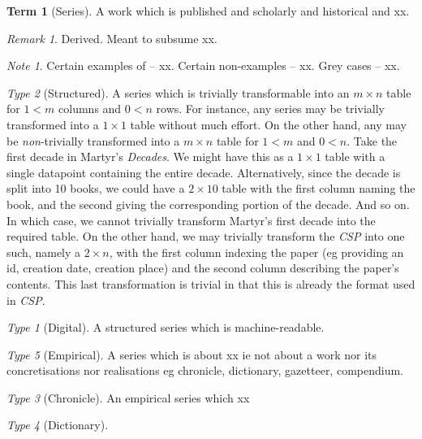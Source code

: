 \documentclass{amsart}%
\newcommand{\titleit}[1]{\textit{#1}}%
\theoremstyle{plain}
\theoremstyle{definition}
\theoremstyle{remark}
\newtheorem*{note}{Note}
\theoremstyle{definition}
\newtheorem{term}{Term}[subsection]%
\theoremstyle{remark}
\newtheorem*{term-type}{Type}
\newtheorem*{term-note}{Remark}
\begin{document}
\begin{term}[Series]
\label{term:series}
A work which is published and scholarly and historical and xx.%
\begin{term-note}
Derived. Meant to subsume xx.
\end{term-note}
\begin{note}
Certain examples of -- xx. Certain non-examples -- xx. Grey cases -- xx.
\end{note}
\begin{term-type}[Structured]
A series which is trivially transformable into an \(m\times n\) table for \(1<m\) columns and \(0<n\) rows. For instance, any series may be trivially transformed into a \(1\times 1\) table without much effort. On the other hand, any may be \emph{non}-trivially transformed into a \(m\times n\) table for \(1<m\) and \(0<n\). Take the first decade in Martyr's \titleit{Decades}. We might have this as a \(1\times 1\) table with a single datapoint containing the entire decade. Alternatively, since the decade is split into 10 books, we could have a \(2\times 10\) table with the first column naming the book, and the second giving the corresponding portion of the decade. And so on. In which case, we cannot trivially transform Martyr's first decade into the required table. On the other hand, we may trivially transform the \titleit{CSP} into one such, namely a \(2\times n\), with the first column indexing the paper (eg providing an id, creation date, creation place) and the second column describing the paper's contents. This last transformation is trivial in that this is already the format used in \titleit{CSP}.
\begin{term-type}[Digital]
A structured series which is machine-readable.%
\end{term-type}%
\end{term-type}%
\begin{term-type}[Empirical]
A series which is about xx ie not about a work nor its concretisations nor realisations eg chronicle, dictionary, gazetteer, compendium.
\begin{term-type}[Chronicle]
An empirical series which xx
\end{term-type}%
\begin{term-type}[Dictionary]

\end{term-type}
\end{term-type}
\end{term}
\end{document}
